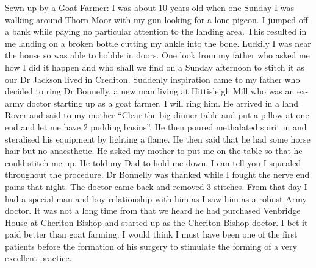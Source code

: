 Sewn up by a Goat Farmer: I was about 10 years old when one Sunday I was
walking around Thorn Moor with my gun looking for a lone pigeon. I jumped off
a bank while paying no particular attention to the landing area. This resulted
in me landing on a broken bottle cutting my ankle into the bone. Luckily I was
near the house so was able to hobble in doors. One look from my father who
asked me how I did it happen and who shall we find on a Sunday afternoon to
stitch it as our Dr Jackson lived in Crediton. Suddenly inspiration came to my
father who decided to ring Dr Bonnelly, a new man living at Hittisleigh Mill
who was an ex-army doctor starting up as a goat farmer. I will ring him. He
arrived in a land Rover and said to my mother ``Clear the big dinner table and
put a pillow at one end and let me have 2 pudding basins''. He then poured
methalated spirit in and steralised his equipment by lighting a flame. He then
said that he had some horse hair but no anaesthetic. He asked my mother to put
me on the table so that he could stitch me up. He told my Dad to hold me down.
I can tell you I squealed throughout the procedure. Dr Bonnelly was thanked
while I fought the nerve end pains that night. The doctor came back and
removed 3 stitches. From that day I had a special man and boy relationship
with him as I saw him as a robust Army doctor. It was not a long time from
that we heard he had purchased Venbridge House at Cheriton Bishop and started
up as the Cheriton Bishop doctor. I bet it paid better than goat farming. I
would think I must have been one of the first patients before the formation of
his surgery to stimulate the forming of a very excellent practice.
